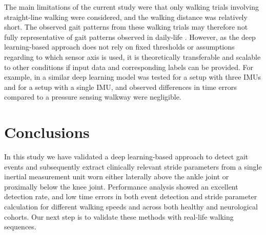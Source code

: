 \documentclass[sensors,article,submit,pdftex,moreauthors]{Definitions/mdpi}
\begin{document}
The main limitations of the current study were that only walking trials involving straight-line walking were considered, and the walking distance was relatively short. The observed gait patterns from these walking trials may therefore not fully representative of gait patterns observed in daily-life \cite{Hillel2019,Warmerdam2020,Atrsaei2021}. However, as the deep learning-based approach does not rely on fixed thresholds or assumptions regarding to which sensor axis is used, it is theoretically transferable and scalable to other conditions if input data and corresponding labels can be provided. For example, in \cite{Gadaleta2019} a similar deep learning model was tested for a setup with three IMUs and for a setup with a single IMU, and observed differences in time errors compared to a pressure sensing walkway were negligible.

\section{Conclusions}
In this study we have validated a deep learning-based approach to detect gait events and subsequently extract clinically relevant stride parameters from a single inertial measurement unit worn either laterally above the ankle joint or proximally below the knee joint. Performance analysis showed an excellent detection rate, and low time errors in both event detection and stride parameter calculation for different walking speeds and across both healthy and neurological cohorts. Our next step is to validate these methods with real-life walking sequences.

\vspace{6pt} 



\end{document}
